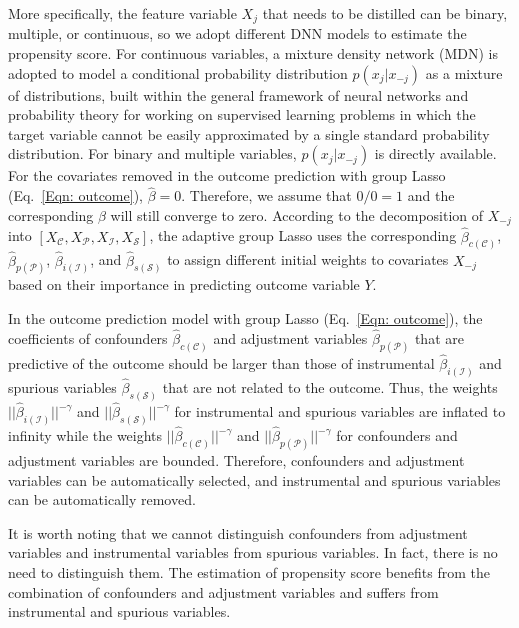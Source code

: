 \documentclass[letterpaper]{article} %
\theoremstyle{definition}
\theoremstyle{remark}
\begin{document}
More specifically, the feature variable $X_j$ that needs to be distilled can be binary, multiple, or continuous, so we adopt different DNN models to estimate the propensity score. For continuous variables, a mixture density network (MDN) \cite{bishop1994mixture} is adopted to model a conditional probability distribution $p(x_j|x_{-j})$ as a mixture of distributions, built within the general framework of neural networks and probability theory for working on supervised learning problems in which the target variable cannot be easily approximated by a single standard probability distribution. For binary and multiple variables, $p(x_j|x_{-j})$ is directly available. For the covariates removed in the outcome prediction with group Lasso (Eq.~\eqref{Eqn: outcome}), $\widehat{\beta}=0$. Therefore, we assume that $0/0=1$ and the corresponding $\beta$ will still converge to zero. According to the decomposition of $X_{-j}$ into $[X_\mathcal{C}, X_\mathcal{P}, X_\mathcal{I}, X_\mathcal{S}]$, the adaptive group Lasso uses the corresponding $\widehat{\beta}_{c(\mathcal{C})}$, $\widehat{\beta}_{p(\mathcal{P})}$, $\widehat{\beta}_{i(\mathcal{I})}$, and $\widehat{\beta}_{s(\mathcal{S})}$ to assign different initial weights to covariates $X_{-j}$ based on their importance in predicting outcome variable $Y$.

In the outcome prediction model with group Lasso (Eq.~\eqref{Eqn: outcome}), the coefficients of confounders $\widehat{\beta}_{c(\mathcal{C})}$ and adjustment variables $\widehat{\beta}_{p(\mathcal{P})}$ that are predictive of the outcome should be larger than those of instrumental $\widehat{\beta}_{i(\mathcal{I})}$ and spurious variables $\widehat{\beta}_{s(\mathcal{S})}$ that are not related to the outcome. Thus, the weights ${||\widehat{\beta}_{i(\mathcal{I})}||^{-\gamma}}$ and ${||\widehat{\beta}_{s(\mathcal{S})}||^{-\gamma}}$ for instrumental and spurious variables are inflated to infinity while the weights ${||\widehat{\beta}_{c(\mathcal{C})}||^{-\gamma}}$ and ${||\widehat{\beta}_{p(\mathcal{P})}||^{-\gamma}}$ for confounders and adjustment variables are bounded. Therefore, confounders and adjustment variables can be automatically selected, and instrumental and spurious variables can be automatically removed.

It is worth noting that we cannot distinguish confounders from adjustment variables and instrumental variables from spurious variables. In fact, there is no need to distinguish them. The estimation of propensity score benefits from the combination of confounders and adjustment variables and suffers from instrumental and spurious variables.
\end{document}
